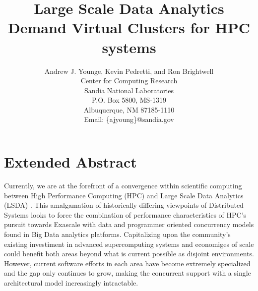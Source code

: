 
\newcommand{\AJY}[1]{{\color{red}\em  AJY: #1}}
\newcommand{\TODO}[1]{{\color{green}\em  TODO: #1}}
\newcommand{\E}[1]{{\color{red}~\blacksquare~\footnote{grammar, spelling, sentence, or other error}~}}

\newcommand{\AUTHOR}{%
Andrew J. Younge, Kevin Pedretti, and Ron Brightwell\\
Center for Computing Research \\
Sandia National Laboratories \\
P.O. Box 5800, MS-1319 \\
Albuquerque, NM 87185-1110 \\
Email: \{ajyoung\}@sandia.gov%
}

\newcommand{\TITLE}{Large Scale Data Analytics Demand Virtual Clusters for HPC systems}


\title{\TITLE}
\author{\AUTHOR}

\maketitle

\begin{abstract}




\end{abstract}

\section{Extended Abstract}

Currently, we are at the forefront of a convergence within scientific computing between High Performance Computing (HPC) and Large Scale Data Analytics (LSDA) \cite{reed2015exascale, leeland2016}. This amalgamation of historically differing viewpoints of Distributed Systems looks to force the combination of performance characteristics of HPC's pursuit towards Exascale with data and programmer oriented concurrency models found in Big Data analytics platforms.  Capitalizing upon the community's existing investiment in advanced supercomputing systems and economiges of scale could benefit both areas beyond what is current possible as disjoint environments.  However, current software efforts in each area have become extremely specialized and the gap only continues to grow, making the concurrent support with a single architectural model increasingly intractable.

